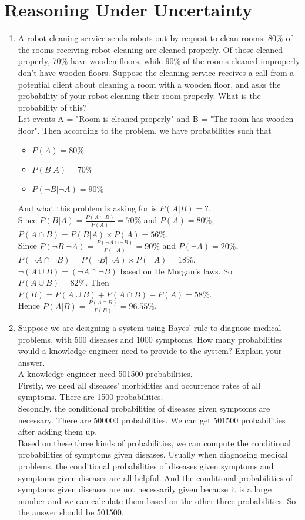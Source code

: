 \documentclass[12pt]{article}
\begin{document}
\section{Reasoning Under Uncertainty}
\begin{enumerate}
\item A robot cleaning service sends robots out by request to clean rooms.  80$\%$ of the rooms receiving robot cleaning are cleaned properly.  Of those cleaned properly, 70$\%$ have wooden floors, while 90$\%$ of the rooms cleaned improperly don't have wooden floors.  Suppose the cleaning service receives a call from a potential client about cleaning a room with a wooden floor, and asks the probability of your robot cleaning their room properly.  What is the probability of this? \\
Let events A = "Room is cleaned properly" and B = "The room has wooden floor". Then according to the problem, we have probabilities such that
\begin{itemize}
\item $P(A) = 80\%$
\item $P(B|A) = 70\%$
\item $P(\neg B|\neg A) = 90\%$
\end{itemize}
And what this problem is asking for is $P(A|B) = ?$. \\
Since $P(B|A) = \frac{P(A\cap B)}{P(A)} = 70\%$ and $P(A) = 80\%$, $P(A\cap B) = P(B|A)\times P(A) = 56\%$. \\
Since $P(\neg B|\neg A) = \frac{P(\neg A\cap\neg B)}{P(\neg A)} = 90\%$ and $P(\neg A) = 20\%$, $P(\neg A\cap\neg B) = P(\neg B|\neg A)\times P(\neg A) = 18\%$. \\
$\neg(A\cup B) = (\neg A\cap\neg B)$ based on De Morgan's laws. So $P(A\cup B) = 82\%$. Then $P(B) = P(A\cup B) + P(A\cap B) - P(A) = 58\%$. \\
Hence $P(A|B) = \frac{P(A\cap B)}{P(B)} = 96.55\%$. 
\item Suppose we are designing a system using Bayes' rule to diagnose medical problems, with 500 diseases and 1000 symptoms.  How many probabilities would a knowledge engineer need to provide to the system?  Explain your answer.\\
A knowledge engineer need 501500 probabilities. \\
Firstly, we need all diseases' morbidities and occurrence rates of all symptoms. There are 1500 probabilities. \\
Secondly, the conditional probabilities of diseases given symptoms are necessary. There are 500000 probabilities. We can get 501500 probabilities after adding them up. \\
Based on these three kinds of probabilities, we can compute the conditional probabilities of symptoms given diseases. Usually when diagnosing medical problems, the conditional probabilities of diseases given symptoms and symptoms given diseases are all helpful. And the conditional probabilities of symptoms given diseases are not necessarily given because it is a large number and we can calculate them based on the other three probabilities. So the answer should be 501500. 
\end{enumerate}
\end{document}
